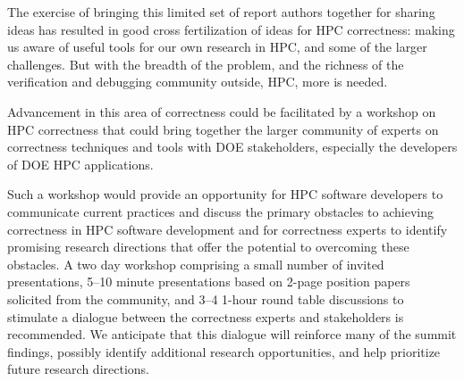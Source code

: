 The exercise of bringing this limited set of report authors together for sharing ideas has resulted in good cross fertilization of ideas for HPC correctness: making us aware of useful tools for our own research in HPC, and some of the larger challenges.  But with the breadth of the problem, and the richness of the verification and debugging community outside, HPC, more is needed.

Advancement in this area of correctness could be facilitated by a workshop on HPC correctness that could bring together the larger community of experts on correctness techniques and tools with DOE stakeholders, especially the developers of DOE HPC applications. 

Such a workshop would provide an opportunity for HPC software developers to communicate current practices and discuss the primary obstacles to achieving correctness in HPC software development and for correctness experts to identify promising research directions that offer the potential to overcoming these obstacles.  A two day workshop comprising a small number of invited presentations, 5--10 minute presentations based on 2-page position papers solicited from the community, and 3--4 1-hour round table discussions to stimulate a dialogue between the correctness experts and stakeholders is recommended.  We anticipate that this dialogue will reinforce many of the summit findings, possibly identify additional research opportunities, and help prioritize future research directions.
